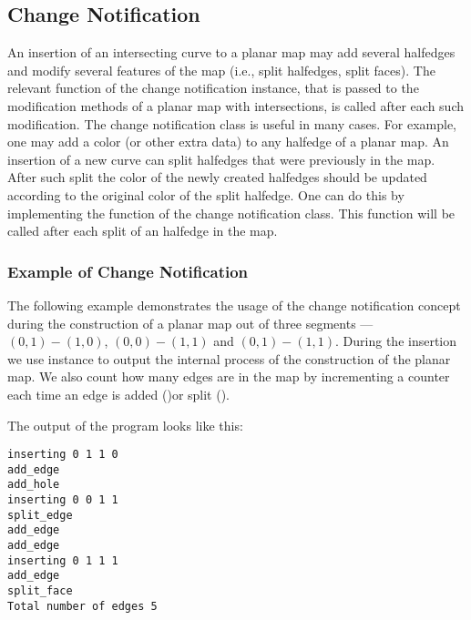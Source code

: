 \begin{ccAdvanced}
\subsection*{Change Notification}
An insertion of an intersecting curve to a planar map may add
several halfedges and modify several features of the map (i.e.,
split halfedges, split faces). The relevant function of the change
notification instance, that is passed to the modification methods
of a planar map with intersections, is called after each such
modification. The change notification class is useful in many
cases. For example, one may add a color (or other extra data) to
any halfedge of a planar map. An insertion of a new curve can
split halfedges that were previously in the map. After such split
the color of the newly created halfedges should be updated
according to the original color of the split halfedge. One can do
this by implementing the  function of the change
notification class. This function will be called after each split
of an halfedge in the map.


\subsubsection{Example of Change Notification}
\label{ssecn:example2}
The following example demonstrates the usage of the change
notification concept during the construction of a
planar map out of three segments --- $(0,1)-(1,0)$, $(0,0)-(1,1)$
and $(0,1)-(1,1)$.
During the insertion we use  instance to
output the internal process of the construction of the planar map.
We also count how many edges are in the map by incrementing a
counter each time an edge is added ()or
split ().


The output of the program looks like this:
\begin{verbatim}
inserting 0 1 1 0
add_edge
add_hole
inserting 0 0 1 1
split_edge
add_edge
add_edge
inserting 0 1 1 1
add_edge
split_face
Total number of edges 5
\end{verbatim}

\end{ccAdvanced}



